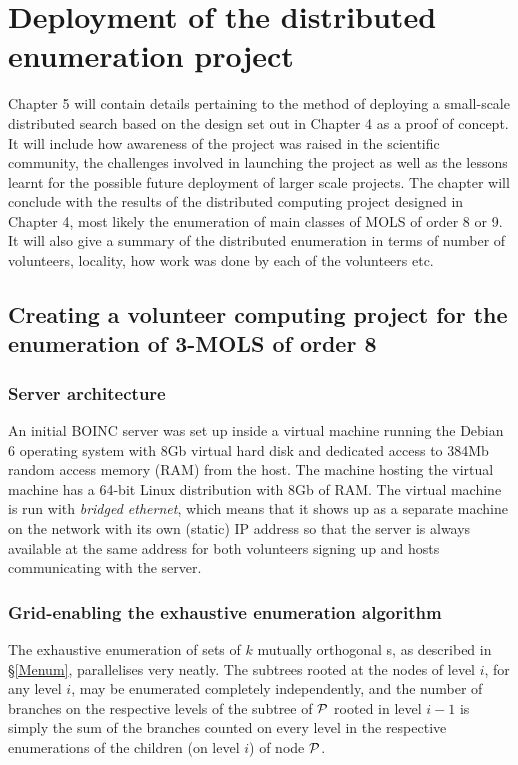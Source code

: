 \chapter{Deployment of the distributed enumeration project}
\vspace{-2em}
\minitoc

Chapter 5 will contain details pertaining to the method of deploying a small-scale distributed search based on the design set out in Chapter 4 as a proof of concept.  It will include how awareness of the project was raised in the scientific community, the  challenges involved in launching the project as well as the lessons learnt for the possible future deployment of larger scale projects.  The chapter will conclude with the results of the distributed computing project designed in Chapter 4, most likely the enumeration of main classes of MOLS of order 8 or 9.  It will also give a summary of the distributed enumeration in terms of number of volunteers, locality, how work was done by each of the volunteers etc. 



\section{Creating a volunteer computing project for the enumeration of 3-MOLS of order 8}
\subsection{Server architecture} \label{5server}
An initial BOINC server was set up inside a virtual machine running the Debian 6 operating system with 8Gb virtual hard disk and dedicated access to 384Mb random access memory (RAM) from the host. The machine hosting the virtual machine has a 64-bit Linux distribution with 8Gb of RAM. 
The virtual machine is run with \emph{bridged ethernet}, which means that it shows up as a separate machine on the network with its own (static) IP address so that the server is always available at the same address for both volunteers signing up and hosts communicating with the server.
\subsection{Grid-enabling the exhaustive enumeration algorithm} \label{5grid}
The exhaustive enumeration of sets of $k$ mutually orthogonal \lat s, as described in \S\ref{Menum}, parallelises very neatly. The subtrees rooted at  the nodes of level $i$, for any level $i$, may be enumerated completely independently, and the   number of branches on the respective levels of the subtree of $\mathcal{P}$ rooted in level $i-1$ is simply the sum of the branches counted on every level in the respective enumerations of the children (on level $i$) of node $\mathcal{P}$.

